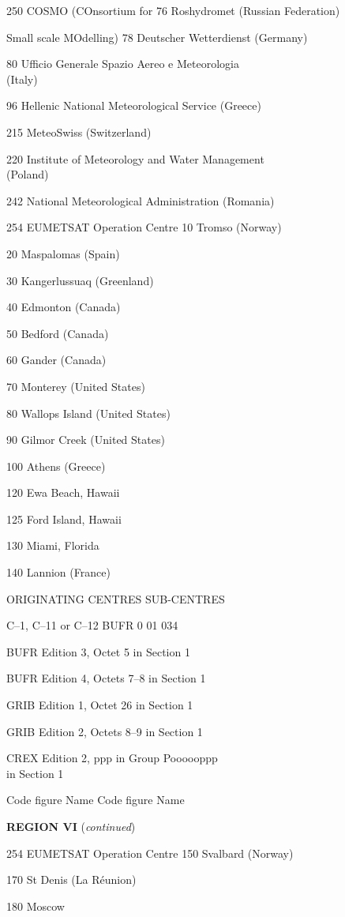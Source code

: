 250 COSMO (COnsortium for 76 Roshydromet (Russian Federation)

Small scale MOdelling) 78 Deutscher Wetterdienst (Germany)

80 Ufficio Generale Spazio Aereo e Meteorologia\\
(Italy)

96 Hellenic National Meteorological Service (Greece)

215 MeteoSwiss (Switzerland)

220 Institute of Meteorology and Water Management\\
(Poland)

242 National Meteorological Administration (Romania)

254 EUMETSAT Operation Centre 10 Tromso (Norway)

20 Maspalomas (Spain)

30 Kangerlussuaq (Greenland)

40 Edmonton (Canada)

50 Bedford (Canada)

60 Gander (Canada)

70 Monterey (United States)

80 Wallops Island (United States)

90 Gilmor Creek (United States)

100 Athens (Greece)

120 Ewa Beach, Hawaii

125 Ford Island, Hawaii

130 Miami, Florida

140 Lannion (France)

ORIGINATING CENTRES SUB-CENTRES

C--1, C--11 or C--12 BUFR 0 01 034

BUFR Edition 3, Octet 5 in Section 1

BUFR Edition 4, Octets 7--8 in Section 1

GRIB Edition 1, Octet 26 in Section 1

GRIB Edition 2, Octets 8--9 in Section 1

CREX Edition 2, ppp in Group Poooooppp\\
in Section 1

Code figure Name Code figure Name

\textbf{REGION VI} (\emph{continued})

254 EUMETSAT Operation Centre 150 Svalbard (Norway)

170 St Denis (La Réunion)

180 Moscow


